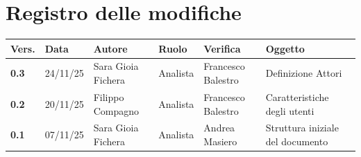 \documentclass[a4paper,12pt]{article}
\begin{document}
    

    \section*{Registro delle modifiche} {
        \begin{table}[h!]
                \begin{tabularx}{\textwidth}{|l|l|l|l|L|L|}
                \hline
                \textbf{Vers.} & \textbf{Data} & \textbf{Autore} & \textbf{Ruolo} & \textbf{Verifica} & \textbf{Oggetto} \\
                \hline
                \textbf{0.3} & 24/11/25 & Sara Gioia Fichera & Analista & Francesco Balestro &  Definizione Attori \\
                \hline
                \textbf{0.2} & 20/11/25 & Filippo Compagno & Analista & Francesco Balestro & Caratteristiche degli utenti \\
                \hline
                \textbf{0.1} & 07/11/25 & Sara Gioia Fichera & Analista & Andrea Masiero & Struttura iniziale del documento \\
                \hline
            \end{tabularx}
        \end{table}
    }
    \newpage
    
    \tableofcontents
    \newpage

    \listoffigures
    \newpage
    
    \listoftables
    \newpage
\end{document}
